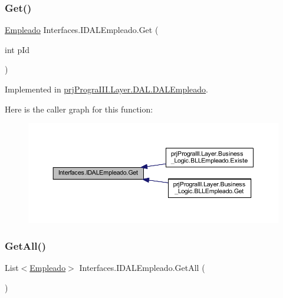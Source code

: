 \subsubsection{\texorpdfstring{Get()}{Get()}}
{\footnotesize\ttfamily \hyperlink{classprj_progra_i_i_i_1_1_layer_1_1_entities_1_1_empleado}{Empleado} Interfaces.\+I\+D\+A\+L\+Empleado.\+Get (\begin{DoxyParamCaption}\item[{int}]{p\+Id }\end{DoxyParamCaption})}



Implemented in \hyperlink{classprj_progra_i_i_i_1_1_layer_1_1_d_a_l_1_1_d_a_l_empleado_a0f1fb578c7f7284e5bdd88be66eb8641}{prj\+Progra\+I\+I\+I.\+Layer.\+D\+A\+L.\+D\+A\+L\+Empleado}.

Here is the caller graph for this function\+:
\nopagebreak
\begin{figure}[H]
\begin{center}
\leavevmode
\includegraphics[width=350pt]{interface_interfaces_1_1_i_d_a_l_empleado_a3a30db206c173af0ed7b44cf21e1de5c_icgraph}
\end{center}
\end{figure}
\hypertarget{interface_interfaces_1_1_i_d_a_l_empleado_a4e47f55e63675f0430e99e0873d269ff}{}\label{interface_interfaces_1_1_i_d_a_l_empleado_a4e47f55e63675f0430e99e0873d269ff} 
\subsubsection{\texorpdfstring{Get\+All()}{GetAll()}}
{\footnotesize\ttfamily List$<$\hyperlink{classprj_progra_i_i_i_1_1_layer_1_1_entities_1_1_empleado}{Empleado}$>$ Interfaces.\+I\+D\+A\+L\+Empleado.\+Get\+All (\begin{DoxyParamCaption}{ }\end{DoxyParamCaption})}



